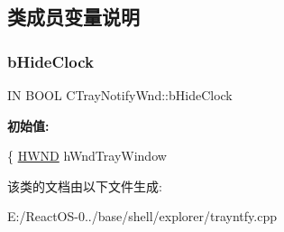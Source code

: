 \subsection{类成员变量说明}
\mbox{\label{class_c_tray_notify_wnd_a1290bfc3399a354f4ca1aff65179e508}} 
\subsubsection{\texorpdfstring{b\+Hide\+Clock}{bHideClock}}
{\footnotesize\ttfamily IN B\+O\+OL C\+Tray\+Notify\+Wnd\+::b\+Hide\+Clock}

{\bfseries 初始值\+:}
\begin{DoxyCode}
\{
        \hyperlink{interfacevoid}{HWND} hWndTrayWindow
\end{DoxyCode}


该类的文档由以下文件生成\+:\begin{DoxyCompactItemize}
\item 
E\+:/\+React\+O\+S-\/0../base/shell/explorer/trayntfy.\+cpp\end{DoxyCompactItemize}
